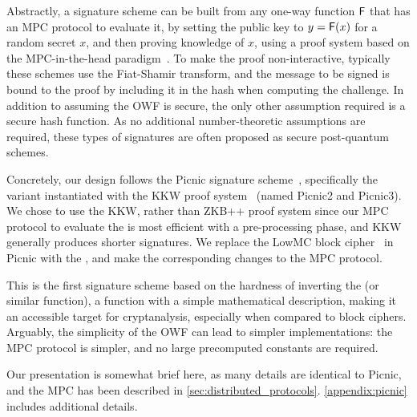 Abstractly, a signature scheme can be built from any one-way function $\mathsf{F}$
that has an MPC protocol to evaluate it, by setting the public key to $y =
\mathsf{F}(x)$ for a random secret $x$, and then proving knowledge of $x$, using a
proof system based on the MPC-in-the-head paradigm~\cite{ishai2007-zkmpc}.
To make the proof non-interactive, typically these schemes use the Fiat-Shamir transform, 
and the message to be signed is bound to the proof by including it in the hash when computing the challenge. 
In addition to assuming the OWF is secure, the only other assumption required is a
secure hash function. As no additional number-theoretic assumptions are
required, these types of signatures are often proposed as secure post-quantum
schemes. 

Concretely, our design follows the Picnic signature scheme~\cite{chase2017-picnic},
specifically the variant instantiated with the KKW proof
system~\cite{CCS:KatKolWan18} (named Picnic2 and Picnic3).  We chose to use the
KKW, rather than ZKB++ proof system since our MPC protocol to evaluate the
\ttOWF is most efficient with a pre-processing phase, and KKW generally
produces shorter signatures.  We replace the LowMC block cipher~\cite{albrecht2015-lowmc} in Picnic 
with the \ttOWF, and make the corresponding changes to the MPC protocol. 

This is the first signature scheme based on the hardness of inverting the
\ttOWF (or similar function), a function with a simple mathematical
description, making it an accessible target for cryptanalysis, especially when
compared to block ciphers.  Arguably, the simplicity of the OWF can lead to
simpler implementations: the MPC protocol is simpler, and no large precomputed
constants are required. 

Our presentation is somewhat brief here, as many details are identical to Picnic, 
and the \ttOWF MPC has been described in \cref{sec:distributed_protocols}. 
\cref{appendix:picnic} includes additional details. 


